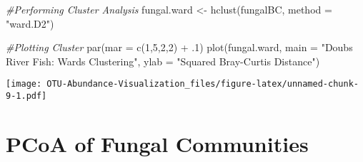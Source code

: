 \documentclass[
]{article}
\newenvironment{Shaded}{\begin{snugshade}}{\end{snugshade}}
\newcommand{\AttributeTok}[1]{\textcolor[rgb]{0.77,0.63,0.00}{#1}}
\newcommand{\CommentTok}[1]{\textcolor[rgb]{0.56,0.35,0.01}{\textit{#1}}}
\newcommand{\DecValTok}[1]{\textcolor[rgb]{0.00,0.00,0.81}{#1}}
\newcommand{\FunctionTok}[1]{\textcolor[rgb]{0.00,0.00,0.00}{#1}}
\newcommand{\NormalTok}[1]{#1}
\newcommand{\OtherTok}[1]{\textcolor[rgb]{0.56,0.35,0.01}{#1}}
\newcommand{\SpecialCharTok}[1]{\textcolor[rgb]{0.00,0.00,0.00}{#1}}
\newcommand{\StringTok}[1]{\textcolor[rgb]{0.31,0.60,0.02}{#1}}
\begin{document}
\begin{Shaded}
\begin{Highlighting}[]
\CommentTok{\#Performing Cluster Analysis}
\NormalTok{fungal.ward }\OtherTok{\textless{}{-}} \FunctionTok{hclust}\NormalTok{(fungalBC, }\AttributeTok{method =} \StringTok{"ward.D2"}\NormalTok{)}

\CommentTok{\#Plotting Cluster}
\FunctionTok{par}\NormalTok{(}\AttributeTok{mar =} \FunctionTok{c}\NormalTok{(}\DecValTok{1}\NormalTok{,}\DecValTok{5}\NormalTok{,}\DecValTok{2}\NormalTok{,}\DecValTok{2}\NormalTok{) }\SpecialCharTok{+}\NormalTok{ .}\DecValTok{1}\NormalTok{)}
\FunctionTok{plot}\NormalTok{(fungal.ward, }\AttributeTok{main =} \StringTok{"Doubs River Fish: Ward\textquotesingle{}s Clustering"}\NormalTok{,}
     \AttributeTok{ylab =} \StringTok{"Squared Bray{-}Curtis Distance"}\NormalTok{)}
\end{Highlighting}
\end{Shaded}

\texttt{[image: OTU-Abundance-Visualization\_files/figure-latex/unnamed-chunk-9-1.pdf]}

\hypertarget{pcoa-of-fungal-communities}{%
\section{PCoA of Fungal Communities}\label{pcoa-of-fungal-communities}}
\end{document}
